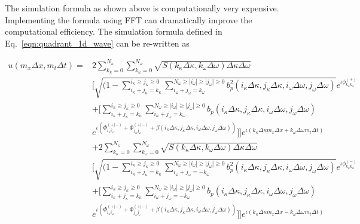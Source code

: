 \documentclass[preprint, review, 12pt]{elsarticle}
\begin{document}
The simulation formula as shown above is computationally very expensive. Implementing the formula using FFT can dramatically improve the computational efficiency. The simulation formula defined in Eq.\ \eqref{eqn:quadrant_1d_wave} can be re-written as

\begin{equation}
\begin{aligned}
    u(m_{x} \Delta x, m_{t} \Delta t) = & 2 \sum_{k_{\kappa}=0}^{N_{\kappa}}\sum_{k_\omega=0}^{N_{\omega}}\sqrt{S(k_{\kappa} \Delta \kappa, k_\omega \Delta \omega) \Delta \kappa \Delta \omega} \\
    & \Big[ \sqrt{(1 - \sum_{i_\kappa + j_\kappa = k_\kappa}^{i_\kappa \geq j_\kappa \geq 0}\sum_{i_\omega + j_\omega = k_\omega}^{N_\omega \geq |i_\omega| \geq |j_\omega| \geq 0} b_{p}^{2}(i_\kappa \Delta \kappa,  j_\kappa \Delta \kappa, i_\omega \Delta \omega, j_\omega \Delta \omega)} e^{\iota\phi_{k_\kappa k_\omega}^{(+)}}\\
    & + [\sum_{i_\kappa + j_\kappa = k_\kappa}^{i_\kappa \geq j_\kappa \geq 0}\sum_{i_\omega + j_\omega = k_\omega}^{N_\omega \geq |i_\omega| \geq |j_\omega| \geq 0} b_{p}(i_\kappa \Delta \kappa, j_\kappa \Delta \kappa, i_\omega \Delta \omega, j_\omega \Delta \omega)\\
    & e^{\iota(\Phi_{i_\kappa i_\omega}^{(+|-)} + \Phi_{j_\kappa j_\omega}^{(+|-)} +\beta(i_\kappa \Delta \kappa, j_\kappa \Delta \kappa, i_\omega \Delta \omega, j_\omega \Delta \omega))}] \Big] e^{\iota(k_\kappa \Delta \kappa m_{x} \Delta x + k_\omega \Delta \omega m_{t} \Delta t)}\\
    & + 2 \sum_{k_{\kappa}=0}^{N_{\kappa}}\sum_{k_\omega=0}^{N_{\omega}}\sqrt{S(k_{\kappa} \Delta \kappa, k_\omega \Delta \omega) \Delta \kappa \Delta \omega} \\
    & \Big[ \sqrt{(1 - \sum_{i_\kappa + j_\kappa = k_\kappa}^{i_\kappa \geq j_\kappa \geq 0}\sum_{i_\omega + j_\omega = -k_\omega}^{N_\omega \geq |i_\omega| \geq |j_\omega| \geq 0} b_{p}^{2}(i_\kappa \Delta \kappa,  j_\kappa \Delta \kappa, i_\omega \Delta \omega, j_\omega \Delta \omega)} e^{\iota\phi_{k_\kappa k_\omega}^{(-)}}\\
    & + [\sum_{i_\kappa + j_\kappa = k_\kappa}^{i_\kappa \geq j_\kappa \geq 0}\sum_{i_\omega + j_\omega = -k_\omega}^{N_\omega \geq |i_\omega| \geq |j_\omega| \geq 0} b_{p}(i_\kappa \Delta \kappa, j_\kappa \Delta \kappa, i_\omega \Delta \omega, j_\omega \Delta \omega)\\
    & e^{\iota(\Phi_{i_\kappa i_\omega}^{(+|-)} + \Phi_{j_\kappa j_\omega}^{(+|-)} +\beta(i_\kappa \Delta \kappa, j_\kappa \Delta \kappa, i_\omega \Delta \omega, j_\omega \Delta \omega))}] \Big] e^{\iota(k_\kappa \Delta \kappa m_{x} \Delta x - k_\omega \Delta \omega m_{t} \Delta t)}
\label{eqn:fft_2d_2_parts}
\end{aligned}
\end{equation}
\end{document}
